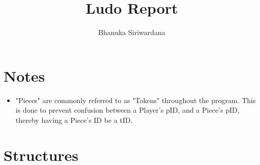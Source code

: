 \documentclass{article}
\title{Ludo Report}
\author{Bhanuka Siriwardana}
\begin{document}
\maketitle
\section{Notes}
\begin{itemize}
    \item "Pieces" are commonly referred to as "Tokens" throughout the program. This is done to prevent confusion between a Player's pID, and a Piece's pID, thereby having a Piece's ID be a tID.
\end{itemize}

\section{Structures}
\end{document}
